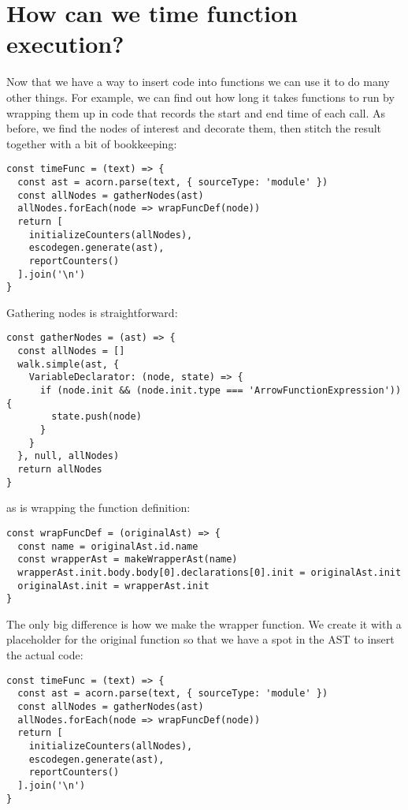 \documentclass[krantzl]{krantz}
\begin{document}
\section{How can we time function execution?}\label{code-generator-time}


Now that we have a way to insert code into functions
we can use it to do many other things.
For example,
we can find out how long it takes functions to run
by wrapping them up in code that records the start and end time of each call.
As before,
we find the nodes of interest and decorate them,
then stitch the result together with a bit of bookkeeping:


\begin{lstlisting}[frame=tblr]
const timeFunc = (text) => {
  const ast = acorn.parse(text, { sourceType: 'module' })
  const allNodes = gatherNodes(ast)
  allNodes.forEach(node => wrapFuncDef(node))
  return [
    initializeCounters(allNodes),
    escodegen.generate(ast),
    reportCounters()
  ].join('\n')
}
\end{lstlisting}



Gathering nodes is straightforward:


\begin{lstlisting}[frame=tblr]
const gatherNodes = (ast) => {
  const allNodes = []
  walk.simple(ast, {
    VariableDeclarator: (node, state) => {
      if (node.init && (node.init.type === 'ArrowFunctionExpression')) {
        state.push(node)
      }
    }
  }, null, allNodes)
  return allNodes
}
\end{lstlisting}



\noindent as is wrapping the function definition:


\begin{lstlisting}[frame=tblr]
const wrapFuncDef = (originalAst) => {
  const name = originalAst.id.name
  const wrapperAst = makeWrapperAst(name)
  wrapperAst.init.body.body[0].declarations[0].init = originalAst.init
  originalAst.init = wrapperAst.init
}
\end{lstlisting}



The only big difference is how we make the wrapper function.
We create it with a placeholder for the original function
so that we have a spot in the AST to insert the actual code:


\begin{lstlisting}[frame=tblr]
const timeFunc = (text) => {
  const ast = acorn.parse(text, { sourceType: 'module' })
  const allNodes = gatherNodes(ast)
  allNodes.forEach(node => wrapFuncDef(node))
  return [
    initializeCounters(allNodes),
    escodegen.generate(ast),
    reportCounters()
  ].join('\n')
}
\end{lstlisting}
\end{document}
